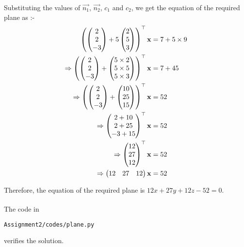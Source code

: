 \documentclass[journal,12pt,twocolumn]{IEEEtran}
\renewcommand\thesection{\arabic{section}}
\begin{document}
\begin{enumerate}[label=\thesection.\arabic*.,ref=\thesection.\theenumi]
Substituting the values of $\vec{n_1}$, $\vec{n_2}$, $c_1$ and $c_2$, we get the equation of the required plane as :-
\begin{align}
\left( \begin{pmatrix}2 \\ 2 \\ -3\end{pmatrix} + 5 \begin{pmatrix}2 \\ 5 \\ 3\end{pmatrix} \right)^{\top}\mathbf{x} &= 7 + 5 \times 9 \\
\Rightarrow \left( \begin{pmatrix}2 \\ 2 \\ -3\end{pmatrix} + \begin{pmatrix}5 \times 2 \\ 5 \times 5 \\ 5 \times 3\end{pmatrix} \right)^{\top}\mathbf{x} &= 7 + 45 \\
\Rightarrow \left( \begin{pmatrix}2 \\ 2 \\ -3\end{pmatrix} + \begin{pmatrix}10 \\ 25 \\ 15\end{pmatrix} \right)^{\top}\mathbf{x} &= 52 \\
\Rightarrow \begin{pmatrix}2 + 10 \\ 2 + 25 \\ -3 + 15\end{pmatrix}^{\top}\mathbf{x} &= 52 \\
\Rightarrow \begin{pmatrix}12 \\ 27 \\ 12\end{pmatrix}^{\top}\mathbf{x} &= 52 \\
\Rightarrow \begin{pmatrix}12 & 27 & 12\end{pmatrix}\mathbf{x} &= 52 \\
\end{align}

Therefore, the equation of the required plane is $12x + 27y + 12z - 52 = 0$.\\
\\
The code in
\begin{lstlisting}
Assignment2/codes/plane.py
\end{lstlisting}
verifies the solution.

\end{enumerate}
\end{document}
